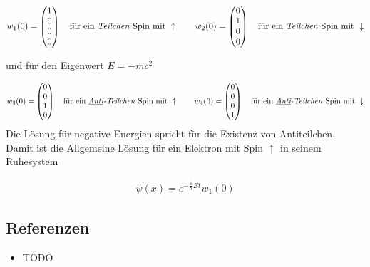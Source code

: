 \begin{align}
  \label{eq:8}
  w_1(0) =
  \begin{pmatrix}
    1\\0\\0\\0
  \end{pmatrix}\quad \text{für ein \textit{Teilchen} Spin mit } \uparrow
\qquad 
 w_2(0) =
  \begin{pmatrix}
    0\\1\\0\\0
  \end{pmatrix}\quad \text{für ein \textit{Teilchen} Spin mit } \downarrow
\end{align}

und für den Eigenwert \(E=-mc^2\)

\begin{align}
  \label{eq:9}
   w_3(0) =
  \begin{pmatrix}
    0\\0\\1\\0
  \end{pmatrix}\quad \text{für ein \textit{\underline{Anti}-Teilchen} Spin mit } \uparrow
\qquad 
 w_4(0) =
  \begin{pmatrix}
    0\\0\\0\\1
  \end{pmatrix}\quad \text{für ein \textit{\underline{Anti}-Teilchen} Spin mit } \downarrow
\end{align}
Die Lösung für negative Energien spricht für die Existenz von Antiteilchen. Damit ist die Allgemeine Lösung für ein Elektron mit Spin \(\uparrow\) in seinem Ruhesystem

\begin{align}
  \label{eq:10}
  \psi(x) = e^{-\frac{i}{\hbar}Et  }w_1(0)
\end{align}




\subsection*{Referenzen}
\begin{itemize}
\item TODO
\end{itemize}


